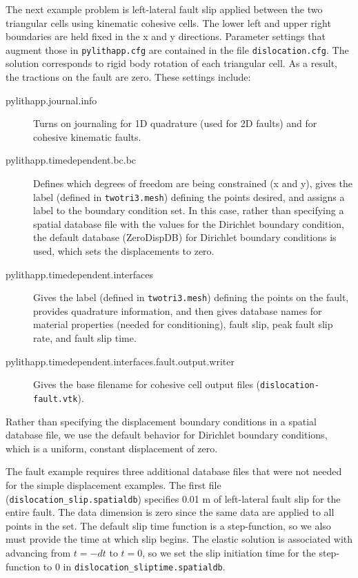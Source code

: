 The next example problem is left-lateral fault slip applied between
the two triangular cells using kinematic cohesive cells. The lower
left and upper right boundaries are held fixed in the x and y directions.
Parameter settings that augment those in \texttt{pylithapp.cfg} are
contained in the file \texttt{dislocation.cfg}. The solution corresponds
to rigid body rotation of each triangular cell. As a result, the tractions
on the fault are zero. These settings include:
\begin{description}
\item [{pylithapp.journal.info}] Turns on journaling for 1D quadrature
(used for 2D faults) and for cohesive kinematic faults.
\item [{pylithapp.timedependent.bc.bc}] Defines which degrees of freedom
are being constrained (x and y), gives the label (defined in \texttt{twotri3.mesh})
defining the points desired, and assigns a label to the boundary condition
set. In this case, rather than specifying a spatial database file
with the values for the Dirichlet boundary condition, the default
database (ZeroDispDB) for Dirichlet boundary conditions is used, which
sets the displacements to zero.
\item [{pylithapp.timedependent.interfaces}] Gives the label (defined in
\texttt{twotri3.mesh}) defining the points on the fault, provides
quadrature information, and then gives database names for material
properties (needed for conditioning), fault slip, peak fault slip
rate, and fault slip time.
\item [{pylithapp.timedependent.interfaces.fault.output.writer}] Gives
the base filename for cohesive cell output files \linebreak{}
(\texttt{dislocation-fault.vtk}).
\end{description}
Rather than specifying the displacement boundary conditions in a spatial
database file, we use the default behavior for Dirichlet boundary
conditions, which is a uniform, constant displacement of zero.

The fault example requires three additional database files that were
not needed for the simple displacement examples. The first file (\texttt{dislocation\_slip.spatialdb})
specifies 0.01 m of left-lateral fault slip for the entire fault.
The data dimension is zero since the same data are applied to all
points in the set. The default slip time function is a step-function,
so we also must provide the time at which slip begins. The elastic
solution is associated with advancing from $t=-dt$ to $t=0$, so
we set the slip initiation time for the step-function to 0 in \texttt{dislocation\_sliptime.spatialdb}.

